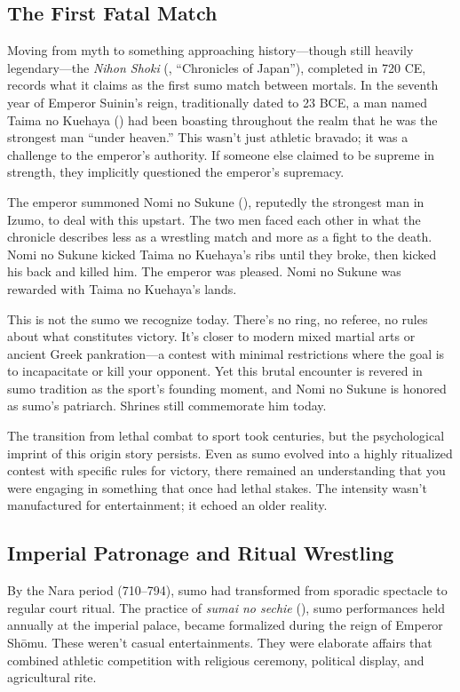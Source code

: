 \subsection{The First Fatal Match}

Moving from myth to something approaching history—though still heavily legendary—the \textit{Nihon Shoki} (, ``Chronicles of Japan''), completed in 720 CE, records what it claims as the first sumo match between mortals. In the seventh year of Emperor Suinin's reign, traditionally dated to 23 BCE, a man named Taima no Kuehaya () had been boasting throughout the realm that he was the strongest man ``under heaven.'' This wasn't just athletic bravado; it was a challenge to the emperor's authority. If someone else claimed to be supreme in strength, they implicitly questioned the emperor's supremacy.

The emperor summoned Nomi no Sukune (), reputedly the strongest man in Izumo, to deal with this upstart. The two men faced each other in what the chronicle describes less as a wrestling match and more as a fight to the death. Nomi no Sukune kicked Taima no Kuehaya's ribs until they broke, then kicked his back and killed him. The emperor was pleased. Nomi no Sukune was rewarded with Taima no Kuehaya's lands.

This is not the sumo we recognize today. There's no ring, no referee, no rules about what constitutes victory. It's closer to modern mixed martial arts or ancient Greek pankration—a contest with minimal restrictions where the goal is to incapacitate or kill your opponent. Yet this brutal encounter is revered in sumo tradition as the sport's founding moment, and Nomi no Sukune is honored as sumo's patriarch. Shrines still commemorate him today.

The transition from lethal combat to sport took centuries, but the psychological imprint of this origin story persists. Even as sumo evolved into a highly ritualized contest with specific rules for victory, there remained an understanding that you were engaging in something that once had lethal stakes. The intensity wasn't manufactured for entertainment; it echoed an older reality.

\subsection{Imperial Patronage and Ritual Wrestling}

By the Nara period (710--794), sumo had transformed from sporadic spectacle to regular court ritual. The practice of \textit{sumai no sechie} (), sumo performances held annually at the imperial palace, became formalized during the reign of Emperor Shōmu. These weren't casual entertainments. They were elaborate affairs that combined athletic competition with religious ceremony, political display, and agricultural rite.

